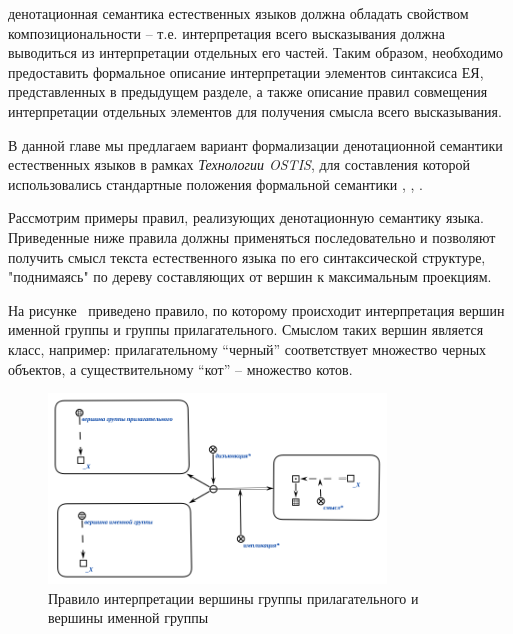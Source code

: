 денотационная семантика естественных языков должна обладать свойством композициональности -- т.е. интерпретация всего высказывания должна выводиться из интерпретации отдельных его частей.
Таким образом, необходимо предоставить формальное описание интерпретации элементов синтаксиса ЕЯ, представленных в предыдущем разделе, а также описание правил совмещения интерпретации отдельных элементов для получения смысла всего высказывания.

В данной главе мы предлагаем вариант формализации денотационной семантики естественных языков в рамках \textit{Технологии OSTIS}, для составления которой использовались стандартные положения формальной семантики , , .

Рассмотрим примеры правил, реализующих денотационную семантику языка.
Приведенные ниже правила должны применяться последовательно и позволяют получить смысл текста естественного языка по его синтаксической структуре, "поднимаясь"{} по дереву составляющих от вершин к максимальным проекциям.

На рисунке~\textit{} приведено правило, по которому происходит интерпретация вершин именной группы и группы прилагательного.
Смыслом таких вершин является класс, например: прилагательному ``черный'' соответствует множество черных объектов, а существительному ``кот'' -- множество котов.

\begin{figure}[H]
    \centering
    \includegraphics[width=0.8\textwidth]{images/part2/chapter_lang/d_sem_1}
    \caption{Правило интерпретации вершины группы прилагательного и вершины именной группы}
    \label{fig:d_sem_1}
\end{figure}

